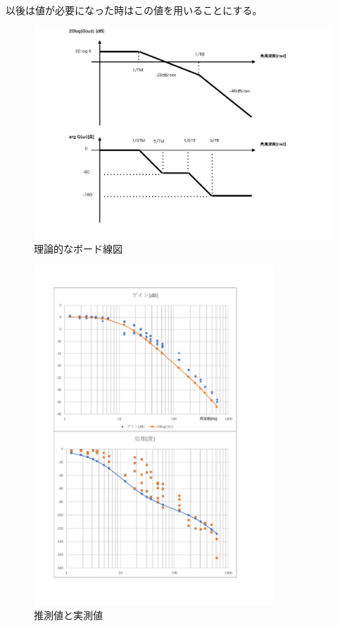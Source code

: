 \documentclass[uplatex, 11pt,a4j, titlepage]{jsarticle}
\begin{document}
以後は値が必要になった時はこの値を用いることにする。

\begin{figure}[h]
    \centering
    \includegraphics[width=12cm]{ideal_bode.pdf}
    \caption{理論的なボード線図}
    \label{ideal_bode}
\end{figure}

\begin{figure}[h]
    \centering
    \includegraphics[width=9cm]{ideal_real.pdf}
    \caption{推測値と実測値}
    \label{ideal_real}
\end{figure}
\end{document}
